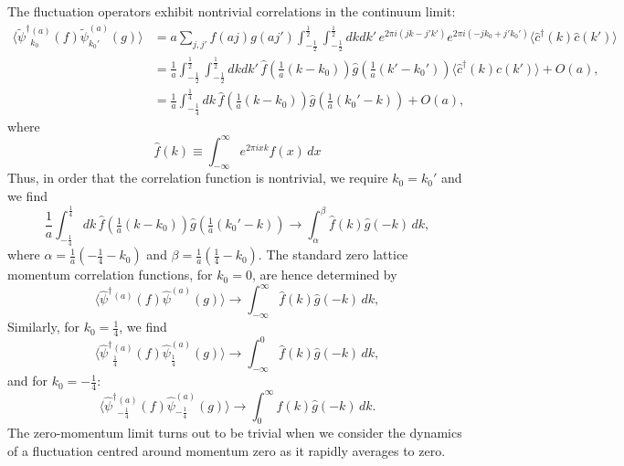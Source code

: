 \documentclass[prl,twocolumn,lengthcheck,superscriptaddress]{revtex4-1}
\theoremstyle{definition}
\theoremstyle{remark}
\begin{document}
The fluctuation operators exhibit nontrivial correlations in the continuum limit:
\begin{equation}
	\begin{split}
		\langle {\widetilde{\psi}^\dag}{}^{(a)}_{k_0}(f)\widetilde{\psi}^{(a)}_{k_0'}(g) \rangle &= a\sum_{j,j'}f(aj)g(aj')\int_{-\frac12}^{\frac12}\int_{-\frac12}^{\frac12} dkdk'\, e^{2\pi i (jk-j'k')}e^{2\pi i (-jk_0+j'k_0')} \langle \widehat{c}^\dag(k)\widehat{c}(k')\rangle \\
		&= \frac{1}{a}\int_{-\frac12}^{\frac12}\int_{-\frac12}^{\frac12} dkdk'\, \widehat{f}(\tfrac1a (k-k_0))\widehat{g}(\tfrac1a (k'-k_0')) \langle \widehat{c}^\dag(k)\widehat{c}(k')\rangle + O(a),\\
		&= \frac{1}{a}\int_{-\frac14}^{\frac14} dk\, \widehat{f}(\tfrac1a (k-k_0))\widehat{g}(\tfrac1a (k_0'-k)) + O(a),
	\end{split}
\end{equation}
where 
\begin{equation}
	\widehat{f}(k) \equiv \int_{-\infty}^\infty e^{2\pi i x k}f(x) \, dx
\end{equation}
Thus, in order that the correlation function is nontrivial, we require $k_0 = k_0'$ and we find
\begin{equation}
	\frac{1}{a}\int_{-\frac14}^{\frac14} dk\, \widehat{f}(\tfrac1a (k-k_0))\widehat{g}(\tfrac1a (k_0'-k)) \rightarrow \int_\alpha^{\beta} \widehat{f}(k)\widehat{g}(-k) \, dk,
\end{equation}
where $\alpha = \frac1a(-\frac14-k_0)$ and $\beta = \frac1a(\frac14-k_0)$. The standard zero lattice momentum correlation functions, for $k_0 = 0$, are hence determined by
\begin{equation}
	\langle {\widehat{\psi}^\dag}{}^{(a)}(f)\widehat{\psi}^{(a)}(g) \rangle \rightarrow \int_{-\infty}^{\infty} \widehat{f}(k)\widehat{g}(-k) \, dk,
\end{equation}
Similarly, for $k_0 = \frac14$, we find 
\begin{equation}
	\langle {\widehat{\psi}^\dag}{}^{(a)}_{\frac14}(f)\widehat{\psi}^{(a)}_{\frac14}(g) \rangle \rightarrow \int_{-\infty}^{0} \widehat{f}(k)\widehat{g}(-k) \, dk,
\end{equation}
and for $k_0 = -\frac14$:
\begin{equation}
	\langle {\widehat{\psi}^\dag}{}^{(a)}_{-\frac14}(f)\widehat{\psi}^{(a)}_{-\frac14}(g) \rangle \rightarrow \int_{0}^{\infty} \widehat{f}(k)\widehat{g}(-k) \, dk.
\end{equation}
The zero-momentum limit turns out to be trivial when we consider the dynamics of a fluctuation centred around momentum zero as it rapidly averages to zero.
\end{document}
